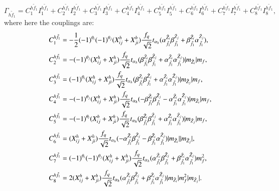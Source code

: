 \documentclass[final,3p,times,pdflatex]{elsarticle}
\begin{document}
\begin{equation}
\Gamma_{h \tilde{f}_1} = C_{1}^{h \tilde{f}_1} I_{1}^{h \tilde{f}_1} + C_{2}^{h \tilde{f}_1} I_{2}^{h \tilde{f}_1} + C_{3}^{h \tilde{f}_1} I_{3}^{h \tilde{f}_1} + C_{4}^{h \tilde{f}_1} I_{4}^{h \tilde{f}_1} + C_{5}^{h \tilde{f}_1} I_{5}^{h \tilde{f}_1} + C_{6}^{h \tilde{f}_1} I_{6}^{h \tilde{f}_1} + C_{7}^{h \tilde{f}_1} I_{7}^{h \tilde{f}_1} + C_{8}^{h \tilde{f}_1} I_{8}^{h \tilde{f}_1},
\end{equation}
where here the couplings are:
\begin{align}
C_{1}^{h \tilde{f}_1} &= -\frac{1}{2}(-1)^{\theta_i}(-1)^{\theta_j}(X_{ij}^h + X_{ji}^h) {f_q \over \sqrt{2}} t_{\alpha_h} ({\alpha_{\tilde{f}_1}^{\tilde{Z}_i}} {\beta_{\tilde{f}_1}^{\tilde{Z}_j}} + {\beta_{\tilde{f}_1}^{\tilde{Z}_i}}{\alpha_{\tilde{f}_1}^{\tilde{Z}_j}}), \\
C_{2}^{h \tilde{f}_1} &= -(-1)^{\theta_j}(X_{ij}^h + X_{ji}^h) {f_q \over \sqrt{2}} t_{\alpha_h} ({\beta_{\tilde{f}_1}^{\tilde{Z}_i}} {\beta_{\tilde{f}_1}^{\tilde{Z}_j}} + {\alpha_{\tilde{f}_1}^{\tilde{Z}_i}}{\alpha_{\tilde{f}_1}^{\tilde{Z}_j}})|m_{\tilde{Z}_i}| m_f, \\
C_{3}^{h \tilde{f}_1} &= (-1)^{\theta_i}(X_{ij}^h + X_{ji}^h) {f_q \over \sqrt{2}} t_{\alpha_h} ({\beta_{\tilde{f}_1}^{\tilde{Z}_i}} {\beta_{\tilde{f}_1}^{\tilde{Z}_j}} + {\alpha_{\tilde{f}_1}^{\tilde{Z}_i}}{\alpha_{\tilde{f}_1}^{\tilde{Z}_j}})|m_{\tilde{Z}_j}| m_f, \\
C_{4}^{h \tilde{f}_1} &= -(-1)^{\theta_j}(X_{ij}^h + X_{ji}^h) {f_q \over \sqrt{2}} t_{\alpha_h} (-{\beta_{\tilde{f}_1}^{\tilde{Z}_i}} {\beta_{\tilde{f}_1}^{\tilde{Z}_j}} - {\alpha_{\tilde{f}_1}^{\tilde{Z}_i}}{\alpha_{\tilde{f}_1}^{\tilde{Z}_j}})|m_{\tilde{Z}_i}| m_f, \\
C_{5}^{h \tilde{f}_1} &= -(-1)^{\theta_i}(X_{ij}^h + X_{ji}^h) {f_q \over \sqrt{2}} t_{\alpha_h} ({\beta_{\tilde{f}_1}^{\tilde{Z}_i}} {\beta_{\tilde{f}_1}^{\tilde{Z}_j}} + {\alpha_{\tilde{f}_1}^{\tilde{Z}_i}}{\alpha_{\tilde{f}_1}^{\tilde{Z}_j}})|m_{\tilde{Z}_j}| m_f, \\
C_{6}^{h \tilde{f}_1} &= (X_{ij}^h + X_{ji}^h) {f_q \over \sqrt{2}} t_{\alpha_h} (-{\alpha_{\tilde{f}_1}^{\tilde{Z}_i}} {\beta_{\tilde{f}_1}^{\tilde{Z}_j}} - {\beta_{\tilde{f}_1}^{\tilde{Z}_i}}{\alpha_{\tilde{f}_1}^{\tilde{Z}_j}})|m_{\tilde{Z}_i}||m_{\tilde{Z}_j}|, \\
C_{7}^{h \tilde{f}_1} &= (-1)^{\theta_i}(-1)^{\theta_j}(X_{ij}^h + X_{ji}^h) {f_q \over \sqrt{2}} t_{\alpha_h} ({\alpha_{\tilde{f}_1}^{\tilde{Z}_i}} {\beta_{\tilde{f}_1}^{\tilde{Z}_j}} + {\beta_{\tilde{f}_1}^{\tilde{Z}_i}}{\alpha_{\tilde{f}_1}^{\tilde{Z}_j}})m_{f}^2, \\
C_{8}^{h \tilde{f}_1} &= 2(X_{ij}^h + X_{ji}^h) {f_q \over \sqrt{2}} t_{\alpha_h} ({\alpha_{\tilde{f}_1}^{\tilde{Z}_i}} {\beta_{\tilde{f}_1}^{\tilde{Z}_j}} + {\beta_{\tilde{f}_1}^{\tilde{Z}_i}}{\alpha_{\tilde{f}_1}^{\tilde{Z}_j}})|m_{\tilde{Z}_i}|m_{f}^2 |m_{\tilde{Z}_j}|.
\end{align}
\end{document}
